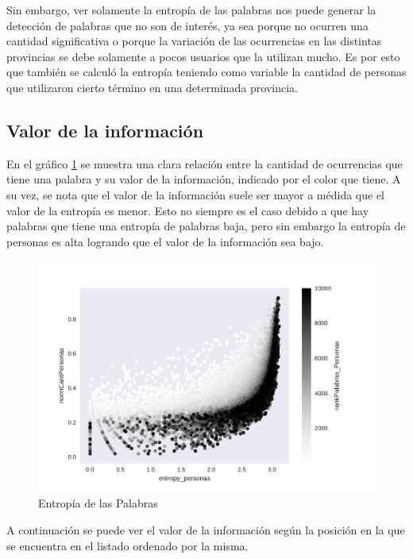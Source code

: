 Sin embargo, ver solamente la entropía de las palabras nos puede generar la detección de palabras que no son de interés, ya sea porque no ocurren una cantidad significativa o porque la variación de las ocurrencias en las distintas provincias se debe solamente a pocos usuarios que la utilizan mucho. Es por esto que también se calculó la entropía teniendo como variable la cantidad de personas que utilizaron cierto término en una determinada provincia.

\subsection{Valor de la información}
\label{sub:ValorDeLaInformacion}
En el gráfico \ref{fig:infoValue} se muestra una clara relación entre la cantidad de ocurrencias que tiene una palabra y su valor de la información, indicado por el color que tiene. A su vez, se nota que el valor de la información suele ser mayor a médida que el valor de la entropía es menor. Esto no siempre es el caso debido a que hay palabras que tiene una entropía de palabras baja, pero sin embargo la entropía de personas es alta logrando que el valor de la información sea bajo.

\begin{figure}[h]
\centering
\includegraphics[width=1.0\textwidth]{./images/entropiaPersonasxNormCantPersonas.pdf}
\caption{Entropía de las Palabras} 
\label{fig:infoValue} 
\end{figure}

A continuación se puede ver el valor de la información según la posición en la que se encuentra en el listado ordenado por la misma.


